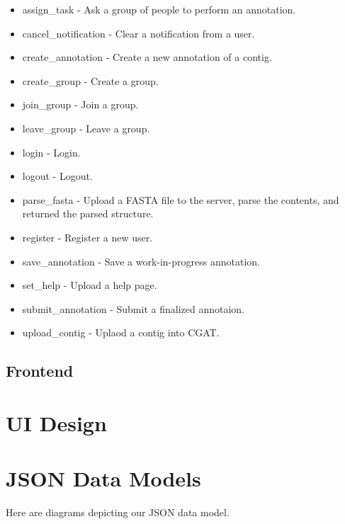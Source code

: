 \documentclass[10pt, conference, compsocconf]{IEEEtran}
\begin{document}
\begin{itemize}
\item assign_task - Ask a group of people to perform an annotation.
\item cancel_notification - Clear a notification from a user.
\item create_annotation - Create a new annotation of a contig.
\item create_group - Create a group.
\item join_group - Join a group.
\item leave_group - Leave a group.
\item login - Login.
\item logout - Logout.
\item parse_fasta - Upload a FASTA file to the server, parse the contents, and returned the parsed structure.
\item register - Register a new user.
\item save_annotation - Save a work-in-progress annotation.
\item set_help - Upload a help page.
\item submit_annotation - Submit a finalized annotaion.
\item upload_contig - Uplaod a contig into CGAT.
\end{itemize}

\subsection{Frontend}

\section{UI Design}

\onecolumn
\appendices

\section{JSON Data Models}\label{sec:data_models}
\centering
Here are diagrams depicting our JSON data model.
\end{document}
